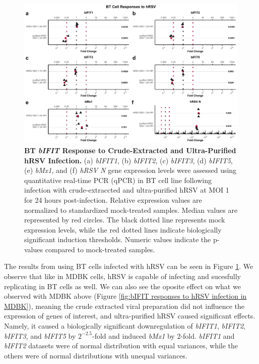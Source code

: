 \begin{figure}
    \centering
    \includegraphics[width=1\linewidth]{07. Chapter 2/Figs/02. Induction/10. bt_hrsv.pdf}
    \caption[BT \textit{bIFIT} Response to Crude-Extracted and Ultra-Purified hRSV Infection.]{\textbf{BT \textit{bIFIT} Response to Crude-Extracted and Ultra-Purified hRSV Infection.} (a) \textit{bIFIT1}, (b) \textit{bIFIT2}, (c) \textit{bIFIT3}, (d) \textit{bIFIT5}, (e) \textit{bMx1}, and (f) \textit{hRSV N} gene expression levels were assessed using quantitative real-time PCR (qPCR) in BT cell line following infection with crude-extraccted and ultra-purified hRSV at MOI 1 for 24 hours post-infection. Relative expression values are normalized to standardized mock-treated samples. Median values are represented by red circles. The black dotted line represents mock expression levels, while the red dotted lines indicate biologically significant induction thresholds. Numeric values indicate the p-values compared to mock-treated samples.}
    \label{fig:Bt responses to hRSV}
\end{figure}

The results from using BT cells infected with hRSV can be seen in Figure \ref{fig:Bt responses to hRSV}. We observe that like in MDBK cells, hRSV is capable of infecting and sucesfully replicating in BT cells as well. We can also see the oposite effect on what we observed with MDBK above (Figure \ref{fig:bIFIT responses to hRSV infection in MDBK}), meaning the crude extracted viral preparation did not influence the expression of genes of interest, and ultra-purified hRSV caused significant effects. Namely, it caused a biologically significant downregulation of \textit{bIFIT1}, \textit{bIFIT2}, \textit{bIFIT3}, and \textit{bIFIT5} by \(2^{-2.5}\)-fold and induced \textit{bMx1} by 2-fold. \textit{bIFIT1} and \textit{bIFIT2} datasets were of normal distribution with equal variances, while the others were of normal distributions with unequal variances.
